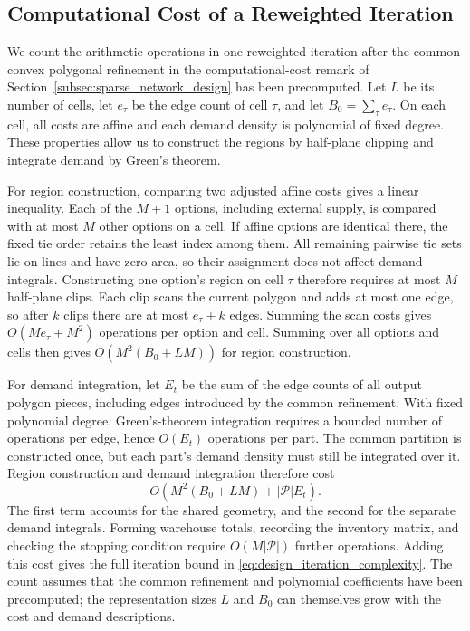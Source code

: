 \documentclass[a4paper,fleqn]{cas-sc}
\theoremstyle{remark}
\theoremstyle{plain}
\begin{document}
\subsection{Computational Cost of a Reweighted Iteration}\label{app:design_complexity}

We count the arithmetic operations in one reweighted iteration after the common convex polygonal refinement in the computational-cost remark of Section~\ref{subsec:sparse_network_design} has been precomputed. Let $L$ be its number of cells, let $e_\tau$ be the edge count of cell $\tau$, and let $B_0=\sum_\tau e_\tau$. On each cell, all costs are affine and each demand density is polynomial of fixed degree. These properties allow us to construct the regions by half-plane clipping and integrate demand by Green's theorem.

For region construction, comparing two adjusted affine costs gives a linear inequality. Each of the $M+1$ options, including external supply, is compared with at most $M$ other options on a cell. If affine options are identical there, the fixed tie order retains the least index among them. All remaining pairwise tie sets lie on lines and have zero area, so their assignment does not affect demand integrals. Constructing one option's region on cell $\tau$ therefore requires at most $M$ half-plane clips. Each clip scans the current polygon and adds at most one edge, so after $k$ clips there are at most $e_\tau+k$ edges. Summing the scan costs gives $O(Me_\tau+M^2)$ operations per option and cell. Summing over all options and cells then gives $O(M^2(B_0+LM))$ for region construction.

For demand integration, let $E_t$ be the sum of the edge counts of all output polygon pieces, including edges introduced by the common refinement. With fixed polynomial degree, Green's-theorem integration requires a bounded number of operations per edge, hence $O(E_t)$ operations per part. The common partition is constructed once, but each part's demand density must still be integrated over it. Region construction and demand integration therefore cost
\[
    O\!\left(M^2(B_0+LM)+|\mathcal P|E_t\right).
\]
The first term accounts for the shared geometry, and the second for the separate demand integrals. Forming warehouse totals, recording the inventory matrix, and checking the stopping condition require $O(M|\mathcal P|)$ further operations. Adding this cost gives the full iteration bound in \eqref{eq:design_iteration_complexity}. The count assumes that the common refinement and polynomial coefficients have been precomputed; the representation sizes $L$ and $B_0$ can themselves grow with the cost and demand descriptions.
\end{document}
